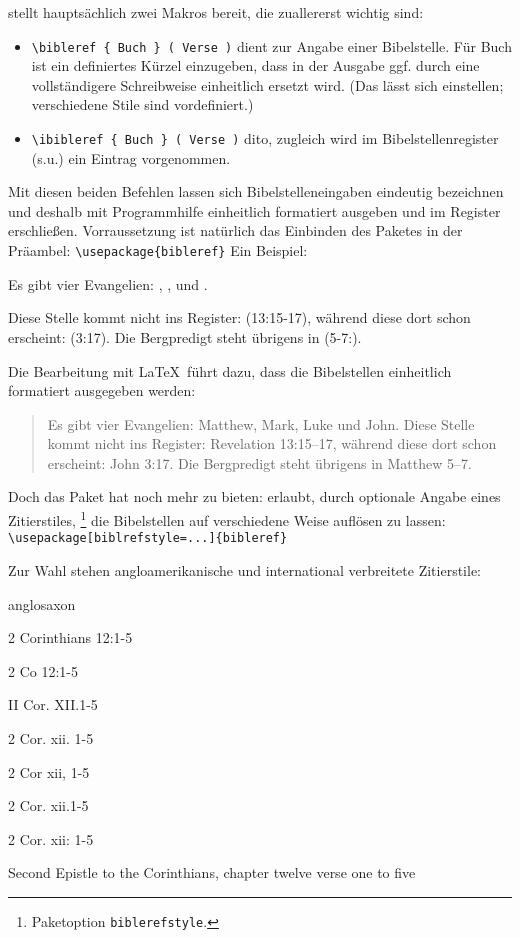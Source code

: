  stellt hauptsächlich zwei Makros bereit, die zuallererst wichtig sind:

\begin{itemize}
    \item \lstinline/\bibleref { Buch } ( Verse )/ dient zur Angabe einer Bibelstelle. 
    Für Buch ist ein definiertes Kürzel einzugeben, dass in der Ausgabe ggf. durch eine vollständigere
    Schreibweise einheitlich ersetzt wird. (Das lässt sich einstellen; verschiedene Stile sind vordefiniert.)
    \item \lstinline/\ibibleref { Buch } ( Verse )/ dito, zugleich wird im Bibelstellenregister (s.u.)
    ein Eintrag vorgenommen.
\end{itemize}

Mit diesen beiden Befehlen lassen sich Bibelstelleneingaben eindeutig bezeichnen und deshalb
mit Programmhilfe einheitlich formatiert ausgeben und im Register erschließen. 
Vorraussetzung ist natürlich das Einbinden des Paketes in der Präambel:
\lstinline/\usepackage{bibleref}/
Ein Beispiel: 

\begin{lfgwcode}{}
Es gibt vier Evangelien: 
, 
, 
 und .

Diese Stelle kommt nicht ins Register: (13:15-17), 
während diese dort schon erscheint: (3:17).
Die Bergpredigt steht übrigens in (5-7:).
\end{lfgwcode}

Die Bearbeitung mit \LaTeX\ führt dazu, dass die Bibelstellen einheitlich formatiert ausgegeben werden:

\begin{quotation}
    Es gibt vier Evangelien: Matthew, Mark, Luke und John.
    Diese Stelle kommt nicht ins Register: Revelation 13:15–17, während diese dort schon
    erscheint: John 3:17. Die Bergpredigt steht übrigens in Matthew 5–7.
\end{quotation}

Doch das Paket hat noch mehr zu bieten:
 erlaubt, durch optionale Angabe eines Zitierstiles,%
\footnote{Paketoption \lstinline|biblerefstyle|.}
die Bibelstellen auf verschiedene
Weise auflösen zu lassen:
\lstinline/\usepackage[biblrefstyle=...]{bibleref}/

Zur Wahl stehen angloamerikanische und international verbreitete Zitierstile:

\begin{labeling}{anglosaxon}
    \item[default] 2 Corinthians 12:1-5
    \item[jerusalem] 2 Co 12:1-5
    \item[anglosaxon] II Cor. XII.1-5
    \item[JEH] 2 Cor. xii. 1-5
    \item[NTG] 2 Cor xii, 1-5
    \item[MLA] 2 Cor. xii.1-5
    \item[chicago] 2 Cor. xii: 1-5
    \item[text] Second Epistle to the Corinthians, chapter twelve verse one to five
\end{labeling}

